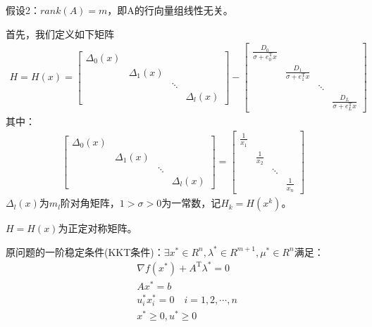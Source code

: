             假设2：$rank(A)=m$，即A的行向量组线性无关。
            \par
            首先，我们定义如下矩阵
            \begin{align*}
             H=H(x)=\begin{bmatrix}
              {\Delta}_0(x)&{}&{}&{}\\
             {}&{\Delta}_1(x)&{}&{}\\
             {}&{}&\ddots&{}\\
             {}&{}&{}&{\Delta}_l(x)
             \end{bmatrix}-\begin{bmatrix}
             \frac{D_0}{\sigma+e_0^\mathrm{T} x}&{}&{}&{}\\
             {}&\frac{D_1}{\sigma+e_1^\mathrm{T} x}&{}&{}\\
             {}&{}&\ddots&{}\\
             {}&{}&{}&\frac{D_L}{\sigma+e_L^\mathrm{T} x}
             \end{bmatrix}
              \end{align*}
              其中：
              \begin{align*}
             \begin{bmatrix}
              {\Delta}_0(x)&{}&{}&{}\\
             {}&{\Delta}_1(x)&{}&{}\\
             {}&{}&\ddots&{}\\
             {}&{}&{}&{\Delta}_l(x)
             \end{bmatrix}=\begin{bmatrix}
             \frac{1}{x_1}&{}&{}&{}\\
             {}&\frac{1}{x_2}&{}&{}\\
             {}&{}&\ddots&{}\\
             {}&{}&{}&\frac{1}{x_n}
             \end{bmatrix}
              \end{align*}
            ${\Delta}_l(x)$为$m_l$阶对角矩阵，$1>\sigma >0$为一常数，记$H_k=H(x^k)$。
            \begin{lemma}[1]
            $H=H(x)$为正定对称矩阵。
            \end{lemma}
            \begin{lemma}[2]
            原问题的一阶稳定条件(KKT条件)：$\exists x^*\in R^n,{\lambda}^*\in R^{m+1},{\mu}^*\in R^n$满足：
            \begin{align*}
                &{\nabla} f(x^*)+A^\mathrm{T} {\lambda}^*=0\\
                &Ax^*=b\\
                &u_i^*x_i^* = 0\quad i=1,2,\cdots,n\\
                &x^*\geqslant 0,u^*\geqslant 0
                \end{align*}
            \end{lemma}
